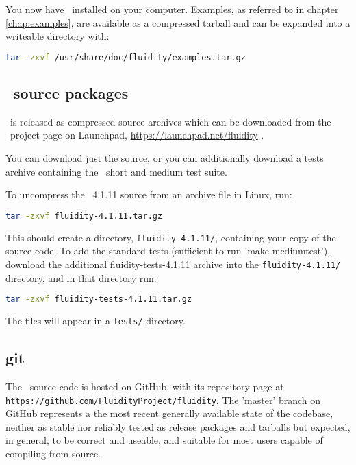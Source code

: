 You now have \fluidity\ installed on your computer. Examples, as referred to in
chapter \ref{chap:examples}, are available as a compressed tarball and can be
expanded into a writeable directory with:

\begin{lstlisting}[language=Bash]
tar -zxvf /usr/share/doc/fluidity/examples.tar.gz
\end{lstlisting}

\subsection{\fluidity\ source packages}

\fluidity\ is released as compressed source archives which can be downloaded
from the \fluidity\ project page on Launchpad,
\href{https://launchpad.net/fluidity}{https://launchpad.net/fluidity} .

You can download just the source, or you can additionally download a tests
archive containing the \fluidity\ short and medium test suite.

To uncompress the \fluidity\ 4.1.11 source from an archive file in Linux,
run:

\begin{lstlisting}[language=Bash]
tar -zxvf fluidity-4.1.11.tar.gz
\end{lstlisting}

This should create a directory, \lstinline[language=Bash]+fluidity-4.1.11/+,
containing your copy of the source code. To add the standard tests (sufficient
to run 'make mediumtest'), download the additional fluidity-tests-4.1.11
archive into the \lstinline[language=Bash]+fluidity-4.1.11/+ directory, and in
that directory run:

\begin{lstlisting}[language=Bash]
tar -zxvf fluidity-tests-4.1.11.tar.gz
\end{lstlisting}

The files will appear in a \lstinline[language=Bash]+tests/+ directory.

\subsection{git}
\label{sec:bazaar}

The \fluidity\ source code is hosted on GitHub, with its repository page at
\lstinline[language=Bash]+https://github.com/FluidityProject/fluidity+. The
'master' branch on GitHub represents a the most recent generally available
state of the codebase, neither as stable nor reliably tested as release
packages and tarballs but expected, in general, to be correct and useable,
and suitable for most users capable of compiling from source.

